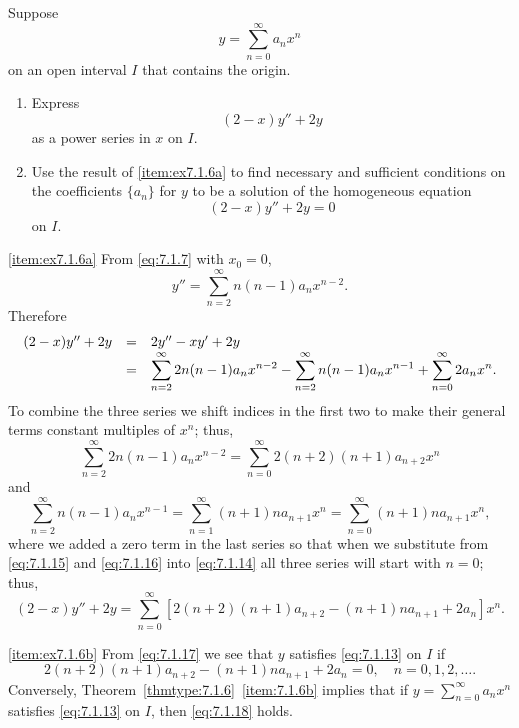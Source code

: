 \documentclass{ximera}
\begin{document}
\begin{example}\label{example:7.1.6}
Suppose
$$
y=\sum_{n=0}^\infty a_n x^n
$$
 on an open interval $I$ that contains the origin.
\begin{enumerate}
\item\label{item:ex7.1.6a} %
Express
$$
(2-x)y''+2y
$$
as a power series in $x$ on $I$.
\item\label{item:ex7.1.6b} %
Use the result of \ref{item:ex7.1.6a} to find necessary and sufficient conditions
on the coefficients $\{a_n\}$ for
 $y$ to be  a solution of the homogeneous equation
\begin{equation} \label{eq:7.1.13}
(2-x)y''+2y=0
\end{equation}
on $I$.
\end{enumerate}

\begin{explanation}
\ref{item:ex7.1.6a}
From \eqref{eq:7.1.7} with $x_0=0$,
$$
y''=\sum_{n=2}^\infty n(n-1)a_nx^{n-2}.
$$
Therefore
\begin{equation} \label{eq:7.1.14}
\begin{array}{rcl}
(2-x)y''+2y&=&2y''-xy'+2y\\
&=&\displaystyle{\sum_{n=2}^\infty 2n(n-1)a_nx^{n-2}
-\sum_{n=2}^\infty n(n-1)a_nx^{n-1}
+\sum_{n=0}^\infty 2a_n x^n}.
\end{array}
\end{equation}
To combine the three series we  shift indices in the first two to
make their general terms  constant multiples of $x^n$;   thus,
\begin{equation} \label{eq:7.1.15}
\sum_{n=2}^\infty
2n(n-1)a_nx^{n-2}=\sum_{n=0}^\infty2(n+2)(n+1)a_{n+2}x^n
\end{equation}
and
\begin{equation} \label{eq:7.1.16}
\sum_{n=2}^\infty n(n-1)a_nx^{n-1}=\sum_{n=1}^\infty(n+1)na_{n+1}x^n
=\sum_{n=0}^\infty(n+1)na_{n+1}x^n,
\end{equation}
where we added a zero term in the last series so that when we
substitute from \eqref{eq:7.1.15} and \eqref{eq:7.1.16} into \eqref{eq:7.1.14}
all three series will start with $n=0$;   thus,
\begin{equation} \label{eq:7.1.17}
(2-x)y''+2y=\sum_{n=0}^\infty
[2(n+2)(n+1)a_{n+2}-(n+1)na_{n+1}+2a_n]x^n.
\end{equation}

\ref{item:ex7.1.6b} From   \eqref{eq:7.1.17}
we see that $y$ satisfies \eqref{eq:7.1.13} on $I$ if
\begin{equation} \label{eq:7.1.18}
2(n+2)(n+1)a_{n+2}-(n+1)na_{n+1}+2a_n=0,\quad n=0,1,2, \dots.
\end{equation}
Conversely, Theorem~\ref{thmtype:7.1.6}~\ref{item:7.1.6b} implies that if
$y=\sum_{n=0}^\infty a_nx^n$
satisfies \eqref{eq:7.1.13} on $I$,  then \eqref{eq:7.1.18} holds.
\end{explanation}
\end{example}
\end{document}
